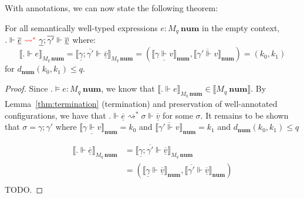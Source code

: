 With annotations, we can now state the following theorem:
\begin{theorem}\label{thm:error-soundness}
  For all semantically well-typed expressions $e : M_q \ \mathbf{num}$ in the
  empty context, $. \Vdash \underline{\overline{e}} \
  \textcolor{red}{\rightsquigarrow^*} \ \underline{\gamma}; \overline{\gamma'}
  \Vdash \underline{\overline{v}}$ where:
  $$
  \llbracket . \Vdash e \rrbracket_{M_q \ \mathbf{num}} 
  = \llbracket \underline{\gamma}; \overline{\gamma'} \Vdash
  \underline{\overline{v}} \rrbracket_{M_q \ \mathbf{num}} 
  = (\llbracket \underline{\gamma \Vdash v} \rrbracket_{\mathbf{num}},
  \llbracket \overline{\gamma' \Vdash v} \rrbracket_{\mathbf{num}}) 
  = (k_0, k_1)
  $$
  for $d_{\mathbf{num}}(k_0, k_1) \leq q$.
\end{theorem}
\begin{proof}
  Since $. \vDash e : M_q \ \mathbf{num}$, we know that $\llbracket . \Vdash e
  \rrbracket_{M_q \ \mathbf{num}} \in \llbracket M_q \ \mathbf{num}
  \rrbracket$. 
  By Lemma~\ref{thm:termination} (termination) and preservation of
  well-annotated configurations, we have that 
  $. \Vdash \underline{\overline{e}} \rightsquigarrow^{*} \sigma \Vdash
  \underline{\overline{v}}$ for some $\sigma$.
  It remains to be shown that $\sigma = \gamma; \gamma'$ where $\llbracket \underline{\gamma \Vdash v}
  \rrbracket_{\mathbf{num}} = k_0$ and $\llbracket \overline{\gamma' \Vdash v}
  \rrbracket_{\mathbf{num}} = k_1$ and $d_{\mathbf{num}}(k_0, k_1) \leq q$

  \begin{equation}
    \begin{aligned}
      \llbracket . \Vdash \underline{\overline{e}} \rrbracket_{M_q \ \mathbf{num}} 
        &=
      \llbracket \underline{\gamma}; \overline{\gamma'} \Vdash \underline{\overline{v}} \rrbracket_{M_q \ \mathbf{num}} \\
      &=
      (\llbracket \underline{\gamma} \Vdash \underline{\overline{v}} \rrbracket_{\mathbf{num}}, \llbracket \overline{\gamma'} \Vdash \underline{\overline{v}} \rrbracket_{\mathbf{num}}) \\
    \end{aligned}
  \end{equation}
  TODO.
\end{proof}


